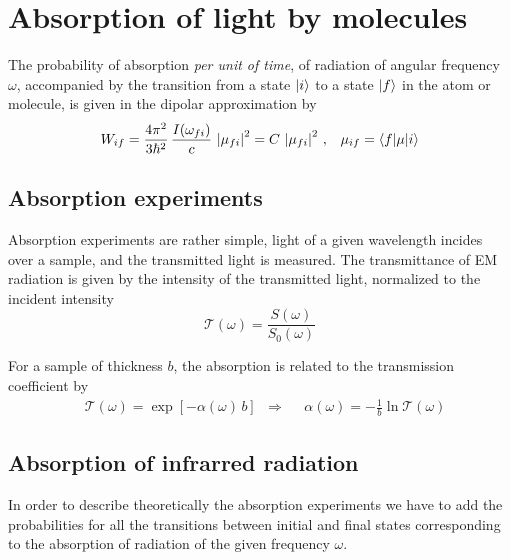 \newcommand{\Tu}{\ensuremath{\text{T}_{\text{1u}}}}

\chapter{Absorption of light by molecules}
\label{C:light-absorpt-molec}

The probability of absorption \emph{per unit of time}, of radiation of angular frequency $\omega$, accompanied by the transition from a state $\left| i \right\rangle$ to a state $\left| f \right\rangle$ in the atom or molecule, is given in the dipolar approximation by
\begin{align}\label{Q:Wif-absorc-dipol}
  W_{if} &= \frac{4 \pi^{2}}{3 \hbar^{2}}\,\frac{I(\omega_{fi})}{c}\, \left| \mathbf{\mu}_{fi} \right|^{2} = C\, \left| \mathbf{\mu}_{fi} \right|^{2} \,, & \mathbf{\mu}_{if}= \left\langle f | \mathbf{\mu} | i \right\rangle
\end{align}

\section{Absorption experiments}
\label{S:absorpt-experim}

Absorption experiments are rather simple, light of a given wavelength incides over a sample, and the transmitted light is measured. 
The transmittance of EM radiation is given by the intensity of the transmitted light, normalized to the incident intensity 
%
\begin{equation}  \label{Q:def-transmitancia}
  \mathcal{T}(\omega) = \frac{S(\omega)}{S_{0}(\omega)}
\end{equation}

For a sample of thickness $b$, the absorption is related to the transmission coefficient by
\begin{align}
  \label{Q:def-absorbancia}
  &\mathcal{T}(\omega) = \exp{\left[- \alpha(\omega)\,b \right]} & \Rightarrow &  & \alpha(\omega) = -\frac{1}{b} \ln{\mathcal{T}(\omega)}
\end{align}


\section{Absorption of infrarred radiation}
\label{S:absorpt-infr-radi}

In order to describe theoretically the absorption experiments we have to add the probabilities for all the transitions between initial and final states corresponding to the absorption of 
radiation of the given frequency $\omega$.


